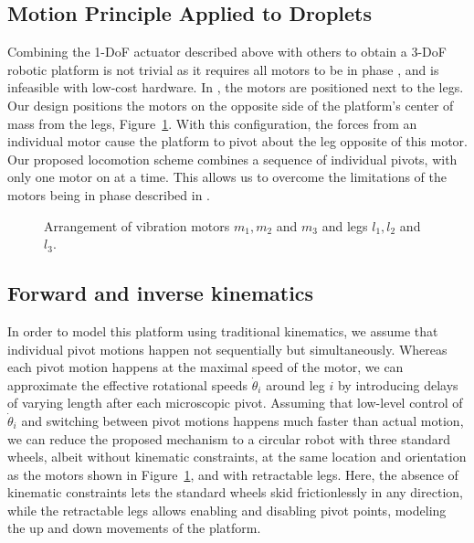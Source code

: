 \documentclass[letterpaper, 10pt, conference]{ieeeconf}
\begin{document}
\subsection{Motion Principle Applied to Droplets}
Combining the 1-DoF actuator described above with others to obtain a 3-DoF robotic platform is not trivial as it requires all motors to be in phase \cite{Vartholomeos2005}, and is infeasible with low-cost hardware. In \cite{Vartholomeos2005}, the motors are positioned next to the legs. Our design positions the motors on the opposite side of the platform's center of mass from the legs, Figure~\ref{DropletMotorDiagram}. With this configuration, the forces from an individual motor cause the platform to pivot about the leg opposite of this motor. Our proposed locomotion scheme combines a sequence of individual pivots, with only one motor on at a time. This allows us to overcome the limitations of the motors being in phase described in \cite{Vartholomeos2005}.

\begin{figure}[!htb]
\centering

\caption{Arrangement of vibration motors $m_1, m_2$ and $m_3$ and legs $l_1, l_2$ and $l_3$.}
\label{DropletMotorDiagram}
\end{figure}

\subsection{Forward and inverse kinematics}
In order to model this platform using traditional kinematics, we assume that individual pivot motions happen not sequentially but simultaneously. Whereas each pivot motion happens at the maximal speed of the motor, we can approximate the effective rotational speeds $\dot{\theta}_i$ around leg $i$ by introducing delays of varying length after each microscopic pivot. Assuming that low-level control of $\dot{\theta}_i$ and switching between pivot motions happens much faster than actual motion, we can reduce the proposed mechanism to a circular robot with three standard wheels, albeit without kinematic constraints, at the same location and orientation as the motors shown in Figure~\ref{DropletMotorDiagram}, and with retractable legs. Here, the absence of kinematic constraints lets the standard wheels skid frictionlessly in any direction, while the retractable legs allows enabling and disabling pivot points, modeling the up and down movements of the platform. 
\end{document}
